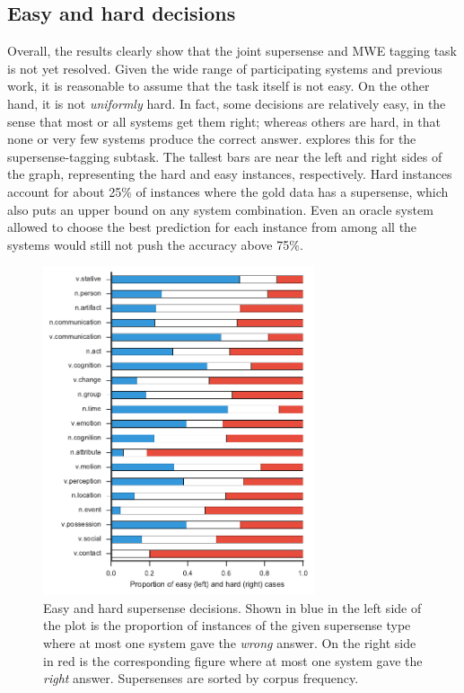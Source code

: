 \documentclass[11pt,letterpaper]{article}
\begin{document}
\subsection{Easy and hard decisions}

Overall, the results clearly show that the joint supersense and MWE tagging task is not yet resolved. 
Given the wide range of participating systems and previous work, it is reasonable to assume that 
the task itself is not easy. On the other hand, it is not \emph{uniformly} hard. 
In fact, some decisions are relatively easy, in the sense that most or all systems get them right; 
whereas others are hard, in that none or very few systems produce the correct answer. 
 explores this for the supersense-tagging subtask. 
The tallest bars are near the left and right sides of the graph, representing the hard and easy instances, respectively. 
Hard instances account for about 25\% of instances where the gold data has a supersense, 
which also puts an upper bound on any system combination. 
Even an oracle system allowed to choose the best prediction for each instance 
from among all the systems would still not push the accuracy above 75\%.

\begin{figure}[t]
	\includegraphics[width=8cm]{figs/proportion_of_easy_and_hard_supersenses.pdf}
	\caption{Easy and hard supersense decisions. Shown in blue in the left side of the plot is the proportion of instances of the given supersense type where at most one system gave the \emph{wrong} answer. On the right side in red is the corresponding figure where at most one system gave the \emph{right} answer. Supersenses are sorted by corpus frequency.}
	\label{fig:easy-and-hard-supersenses}
\end{figure}
\end{document}

